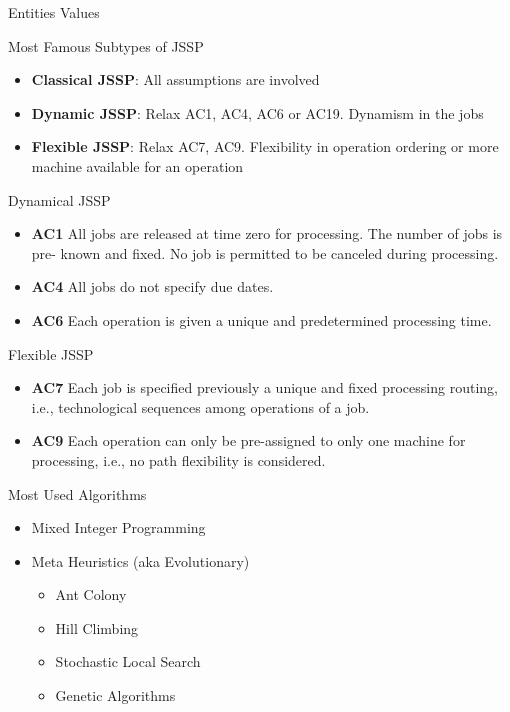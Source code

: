 \documentclass[8pt, xcolor=table]{beamer}
\begin{document}
\begin{frame}[fragile]{Entities Values}
\begin{minipage}[t]{0.5\textwidth}
\begin{figure}[H]
    \end{figure}
  \end{minipage}
\end{frame}


\begin{frame}[fragile]{Most Famous Subtypes of JSSP}
  \begin{itemize}
    \item \textbf{Classical JSSP}: All assumptions are involved
    \item \textbf{Dynamic JSSP}: Relax AC1, AC4, AC6 or AC19. Dynamism in the jobs
    \item \textbf{Flexible JSSP}: Relax AC7, AC9. Flexibility in operation ordering or more machine available for an operation
  \end{itemize}
\end{frame}

\begin{frame}[fragile]{Dynamical JSSP}
  \begin{itemize}
    \item \textbf{AC1} All jobs are released at time zero for processing. The number of jobs is pre-
    known and fixed. No job is permitted to be canceled during processing.
    \item \textbf{AC4} All jobs do not specify due dates.
    \item \textbf{AC6} Each operation is given a unique and predetermined processing time.
  \end{itemize}
\end{frame}

\begin{frame}[fragile]{Flexible JSSP}
  \begin{itemize}
    \item \textbf{AC7} Each job is specified previously a unique and fixed processing routing, i.e.,
    technological sequences among operations of a job.
    \item \textbf{AC9} Each operation can only be pre-assigned to only one machine for processing,
    i.e., no path flexibility is considered.
  \end{itemize}
\end{frame}

\begin{frame}[fragile]{Most Used Algorithms}
  \begin{itemize}
    \item Mixed Integer Programming
    \item Meta Heuristics (aka Evolutionary)
    \begin{itemize}
      \item Ant Colony 
      \item Hill Climbing
      \item Stochastic Local Search
      \item Genetic Algorithms
    \end{itemize}
  \end{itemize}
\end{frame}
\end{document}
